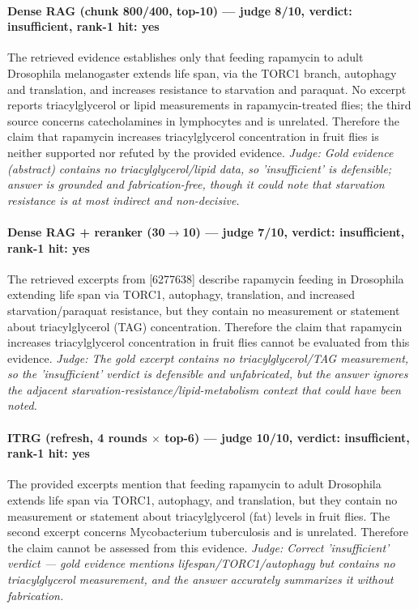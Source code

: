 \documentclass[sigconf, review, anonymous]{acmart}
\begin{document}
\paragraph{Dense RAG (chunk 800/400, top-10) --- judge 8/10, verdict: insufficient, rank-1 hit: yes}
\noindent The retrieved evidence establishes only that feeding rapamycin to adult Drosophila melanogaster extends life span, via the TORC1 branch, autophagy and translation, and increases resistance to starvation and paraquat. No excerpt reports triacylglycerol or lipid measurements in rapamycin-treated flies; the third source concerns catecholamines in lymphocytes and is unrelated. Therefore the claim that rapamycin increases triacylglycerol concentration in fruit flies is neither supported nor refuted by the provided evidence.
\noindent\small\textit{Judge: Gold evidence (abstract) contains no triacylglycerol/lipid data, so 'insufficient' is defensible; answer is grounded and fabrication-free, though it could note that starvation resistance is at most indirect and non-decisive.}
\paragraph{Dense RAG + reranker (30$\to$10) --- judge 7/10, verdict: insufficient, rank-1 hit: yes}
\noindent The retrieved excerpts from [6277638] describe rapamycin feeding in Drosophila extending life span via TORC1, autophagy, translation, and increased starvation/paraquat resistance, but they contain no measurement or statement about triacylglycerol (TAG) concentration. Therefore the claim that rapamycin increases triacylglycerol concentration in fruit flies cannot be evaluated from this evidence.
\noindent\small\textit{Judge: The gold excerpt contains no triacylglycerol/TAG measurement, so the 'insufficient' verdict is defensible and unfabricated, but the answer ignores the adjacent starvation-resistance/lipid-metabolism context that could have been noted.}
\paragraph{ITRG (refresh, 4 rounds $\times$ top-6) --- judge 10/10, verdict: insufficient, rank-1 hit: yes}
\noindent The provided excerpts mention that feeding rapamycin to adult Drosophila extends life span via TORC1, autophagy, and translation, but they contain no measurement or statement about triacylglycerol (fat) levels in fruit flies. The second excerpt concerns Mycobacterium tuberculosis and is unrelated. Therefore the claim cannot be assessed from this evidence.
\noindent\small\textit{Judge: Correct 'insufficient' verdict --- gold evidence mentions lifespan/TORC1/autophagy but contains no triacylglycerol measurement, and the answer accurately summarizes it without fabrication.}
\end{document}
